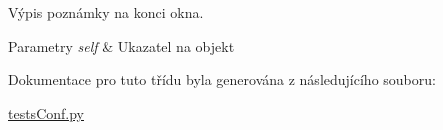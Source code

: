 Výpis poznámky na konci okna. 


\begin{DoxyParams}{Parametry}
{\em self} & Ukazatel na objekt \\
\hline
\end{DoxyParams}


Dokumentace pro tuto třídu byla generována z následujícího souboru\-:\begin{DoxyCompactItemize}
\item 
\hyperlink{testsConf_8py}{tests\-Conf.\-py}\end{DoxyCompactItemize}
